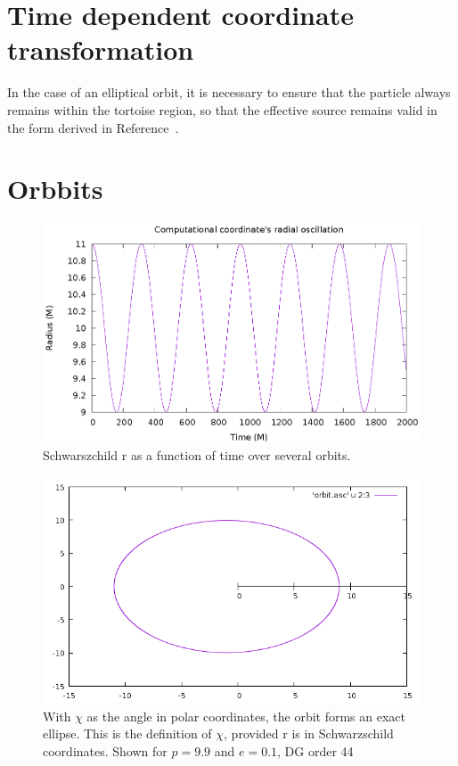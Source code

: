 \section{Time dependent coordinate transformation}

In the case of an elliptical orbit, it is necessary to ensure that the particle always remains within the tortoise region, so that the effective source remains valid in the form derived in Reference~\cite{2ndOrderSource}.  


\section{Orbbits}

\begin{figure}
  \includegraphics{orbit}
  \caption{Schwarszchild r as a function of time over several orbits.}
\end{figure}


\begin{figure}
  \includegraphics{orbitdg44p99e01}
  \caption{With $\chi$ as the angle in polar coordinates, the orbit forms an exact ellipse. This is the definition of $\chi$, provided r is in Schwarzschild coordinates. Shown for $p=9.9$ and $e=0.1$, DG order 44}
\end{figure}

